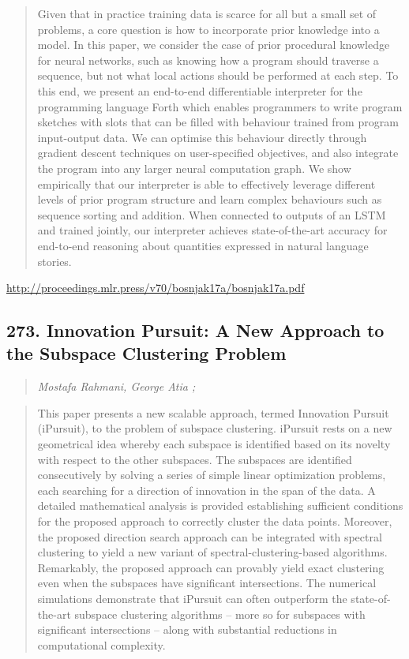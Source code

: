 \documentclass{article}
\begin{document}
\begin{quote}
    Given that in practice training data is scarce for all but a small set of problems, a core question is how to incorporate prior knowledge into a model. In this paper, we consider the case of prior procedural knowledge for neural networks, such as knowing how a program should traverse a sequence, but not what local actions should be performed at each step. To this end, we present an end-to-end differentiable interpreter for the programming language Forth which enables programmers to write program sketches with slots that can be filled with behaviour trained from program input-output data. We can optimise this behaviour directly through gradient descent techniques on user-specified objectives, and also integrate the program into any larger neural computation graph. We show empirically that our interpreter is able to effectively leverage different levels of prior program structure and learn complex behaviours such as sequence sorting and addition. When connected to outputs of an LSTM and trained jointly, our interpreter achieves state-of-the-art accuracy for end-to-end reasoning about quantities expressed in natural language stories.  \end{quote}

\href{http://proceedings.mlr.press/v70/bosnjak17a/bosnjak17a.pdf}{http://proceedings.mlr.press/v70/bosnjak17a/bosnjak17a.pdf}

\subsection{273. Innovation Pursuit: A New Approach to the Subspace Clustering Problem}

\begin{quote}
\footnotesize{\textit{Mostafa Rahmani, George Atia ;}}
\end{quote}

\begin{quote}
    This paper presents a new scalable approach, termed Innovation Pursuit (iPursuit), to the problem of subspace clustering. iPursuit rests on a new geometrical idea whereby each subspace is identified based on its novelty with respect to the other subspaces. The subspaces are identified consecutively by solving a series of simple linear optimization problems, each searching for a direction of innovation in the span of the data. A detailed mathematical analysis is provided establishing sufficient conditions for the proposed approach to correctly cluster the data points. Moreover, the proposed direction search approach can be integrated with spectral clustering to yield a new variant of spectral-clustering-based algorithms. Remarkably, the proposed approach can provably yield exact clustering even when the subspaces have significant intersections. The numerical simulations demonstrate that iPursuit can often outperform the state-of-the-art subspace clustering algorithms – more so for subspaces with significant intersections – along with substantial reductions in computational complexity.  \end{quote}
\end{document}
